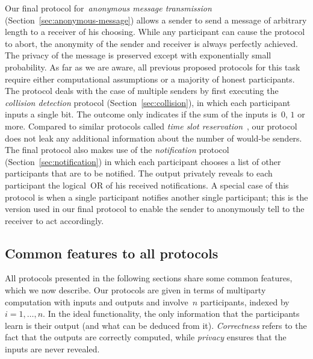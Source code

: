 \documentclass[11pt]{article}
\begin{document}
Our final protocol  for~\emph{anonymous message transmission}
(Section~\ref{sec:anonymous-message}) allows a sender to send a
message of arbitrary length to a receiver of his choosing. While any
participant can cause the protocol to abort, the anonymity of the
sender and receiver is always perfectly achieved. The privacy of the
message is preserved except with exponentially small probability. As
far as we are aware, all previous proposed protocols for this task
require either computational assumptions or a majority of honest
participants. The protocol deals with the case of multiple senders
by first executing the \emph{collision detection} protocol
(Section~\ref{sec:collision}), in which each participant inputs a
single bit. The outcome only indicates  if the sum of the inputs
is~$0$, $1$ or more. Compared to similar protocols called \emph{time
slot reservation}~\cite{Chaum88,WP89}, our protocol does not leak
any additional information about the number of would-be senders. The
final protocol also makes use of the \emph{notification} protocol
(Section~\ref{sec:notification}) in which each participant chooses a
list of other participants that are to be notified. The output
privately reveals to each participant the logical~OR of his received
notifications. A special case of this protocol is when a single
participant notifies another single participant; this is the version
used in our final protocol to enable the sender to anonymously tell
to the receiver to act accordingly.








\subsection{Common features to all protocols}

All protocols presented in the following sections share some common
features, which we now describe. Our protocols are given in terms of
multiparty computation with inputs and outputs and involve~$n$
participants, indexed by~$i=1,\ldots ,n$. In the ideal
functionality, the only information that the participants learn is
their output (and what can be deduced from it). \emph{Correctness}
refers to the fact that the outputs are correctly computed, while
\emph{privacy} ensures that the inputs are never revealed.
\end{document}
